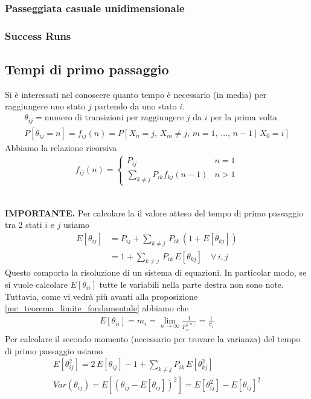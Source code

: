 \documentclass{article}
\begin{document}
\subsubsection{Passeggiata casuale unidimensionale}

\subsubsection{Success Runs}

\subsection{Tempi di primo passaggio}

Si è interessati nel conoscere quanto tempo è necessario (in media) per raggiungere uno stato $j$ partendo da uno stato $i$.
\begin{gather*}
\theta_{ij} = \text{numero di transizioni per raggiungere $j$ da $i$ per la prima volta}\\
P[\theta_{ij} = n] = f_{ij}(n) = P[X_n = j,\,X_m \neq j,\,m = 1,\,\hdots,\,n-1 \mid X_0 = i] 
\end{gather*}
Abbiamo la relazione ricorsiva
\begin{align*}
f_{ij}(n) = \begin{cases}
P_{ij} & n = 1\\
\sum_{k\neq j} P_{ik}f_{kj}(n-1) & n > 1
\end{cases}
\end{align*}\\

\begin{boxedminipage}{\textwidth}
\textbf{IMPORTANTE.} Per calcolare la il valore atteso del tempo di primo passaggio tra 2 stati $i$ e $j$ usiamo
\begin{align*}
E[\theta_{ij}] &= P_{ij} + \sum_{k \neq j}\,P_{ik}\,(1+E[\theta_{kj}])\\
&= 1 + \sum_{k \neq j} \, P_{ik}\, E[\theta_{kj}] \quad \forall\,i,j
\end{align*}
Questo comporta la risoluzione di un sistema di equazioni. In particolar modo, se si vuole calcolare $E[\theta_{ii}]$ tutte le variabili nella parte destra non sono note. Tuttavia, come vi vedrà più avanti alla proposizione \ref{mc_teorema_limite_fondamentale} abbiamo che
\begin{align*}
E[\theta_{ii}] = m_i = \lim_{n\to\infty}\frac{1}{P_{ii}^{(n)}} = \frac{1}{\pi_i}
\end{align*}
Per calcolare il secondo momento (necessario per trovare la varianza) del tempo di primo passaggio usiamo
\begin{gather*}
E[\theta_{ij}^2] = 2\,E[\theta_{ij}] - 1 + \sum_{k \neq j}P_{ik}\,E[\theta_{kj}^2]\\
Var(\theta_{ij}) = E[(\theta_{ij} - E[\theta_{ij}])^2] = E[\theta_{ij}^2] - E[\theta_{ij}]^2
\end{gather*}
\end{boxedminipage}
\end{document}
